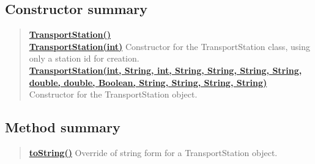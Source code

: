 \documentclass[11pt,a4paper]{report}
\begin{document}
{{{{{{{{{{{{{{{{{{\subsection{Constructor summary}{
\begin{verse}
\hyperlink{models.TransportStation()}{{\bf TransportStation()}} \\
\hyperlink{models.TransportStation(int)}{{\bf TransportStation(int)}} Constructor for the TransportStation class, using only a station id for creation.\\
\hyperlink{models.TransportStation(int, java.lang.String, int, java.lang.String, java.lang.String, java.lang.String, java.lang.String, double, double, java.lang.Boolean, java.lang.String, java.lang.String, java.lang.String, java.lang.String)}{{\bf TransportStation(int, String, int, String, String, String, String, double, double, Boolean, String, String, String, String)}} Constructor for the TransportStation object.\\
\end{verse}
}
\subsection{Method summary}{
\begin{verse}
\hyperlink{models.TransportStation.toString()}{{\bf toString()}} Override of string form for a TransportStation object.\\
\end{verse}
}
}}}}}}}}}}}}}}}}}}
\end{document}
